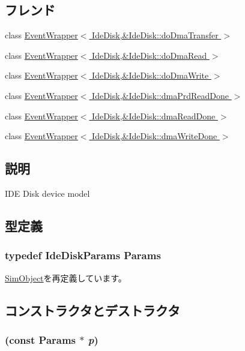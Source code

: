 \subsection*{フレンド}
\begin{DoxyCompactItemize}
\item 
class \hyperlink{classIdeDisk_a07dd701b52fa01c73a9a70a11490190f}{EventWrapper$<$ IdeDisk,\&IdeDisk::doDmaTransfer $>$}
\item 
class \hyperlink{classIdeDisk_accdc7f0b6fabdd3d77c1b559d5145f1e}{EventWrapper$<$ IdeDisk,\&IdeDisk::doDmaRead $>$}
\item 
class \hyperlink{classIdeDisk_ab5b4eef2a93f5c96df001eac024301e2}{EventWrapper$<$ IdeDisk,\&IdeDisk::doDmaWrite $>$}
\item 
class \hyperlink{classIdeDisk_a576a5609a96330636252b99a5d689e36}{EventWrapper$<$ IdeDisk,\&IdeDisk::dmaPrdReadDone $>$}
\item 
class \hyperlink{classIdeDisk_a6de24ef3cf489b4e2419c1ce290ea10f}{EventWrapper$<$ IdeDisk,\&IdeDisk::dmaReadDone $>$}
\item 
class \hyperlink{classIdeDisk_ad39ee160ecba74f2b017af931eec8c6c}{EventWrapper$<$ IdeDisk,\&IdeDisk::dmaWriteDone $>$}
\end{DoxyCompactItemize}


\subsection{説明}
IDE Disk device model 

\subsection{型定義}
\hypertarget{classIdeDisk_a21c0f7d16893ae472d7dbbc6df963053}{
\subsubsection[{Params}]{\setlength{\rightskip}{0pt plus 5cm}typedef IdeDiskParams {\bf Params}}}
\label{classIdeDisk_a21c0f7d16893ae472d7dbbc6df963053}


\hyperlink{classSimObject_a0f0761d2db586a23bb2a2880b8f387bb}{SimObject}を再定義しています。

\subsection{コンストラクタとデストラクタ}
\hypertarget{classIdeDisk_a2e3da8ce499e288eefcec4c9bd396958}{
\subsubsection[{IdeDisk}]{ (const {\bf Params} $\ast$ {\em p})}}
\label{classIdeDisk_a2e3da8ce499e288eefcec4c9bd396958}



